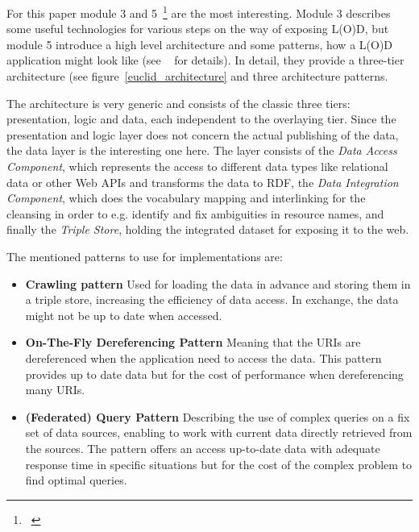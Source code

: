 For this paper module 3 and 5~\footnote{~\cite{euclid:chap5}} are the most interesting. Module 3 describes some useful technologies for various steps on the way of exposing L(O)D, but module 5 introduce a high level architecture and some patterns, how a L(O)D application might look like (see ~\cite{euclid:chap5} for details). In detail, they provide a three-tier architecture (see figure~\ref{euclid_architecture} and three architecture patterns.

The architecture is very generic and consists of the classic three tiers: presentation, logic and data, each independent to the overlaying tier. Since the presentation and logic layer does not concern the actual publishing of the data, the data layer is the interesting one here. The layer consists of the \emph{Data Access Component}, which represents the access to different data types like relational data or other Web APIs and transforms the data to RDF, the \emph{Data Integration Component}, which does the vocabulary mapping and interlinking for the cleansing in order to e.g. identify and fix ambiguities in resource names, and finally the \emph{Triple Store}, holding the integrated dataset for exposing it to the web.

The mentioned patterns to use for implementations are:

\begin{itemize}

\item \textbf{Crawling pattern}
Used for loading the data in advance and storing them in a triple store, increasing the efficiency of data access. In exchange, the data might not be up to date when accessed.

\item \textbf{On-The-Fly Dereferencing Pattern}
Meaning that the URIs are dereferenced when the application need to access the data. This pattern provides up to date data but for the cost of performance when dereferencing many URIs.

\item \textbf{(Federated) Query Pattern}
Describing the use of complex queries on a fix set of data sources, enabling to work with current data directly retrieved from the sources. The pattern offers an access up-to-date data with adequate response time in specific situations but for the cost of the complex problem to find optimal queries.
\end{itemize}

